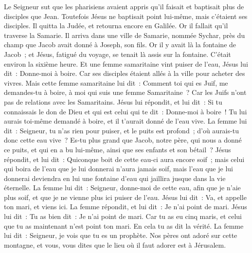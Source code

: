 \begin{multicols}{2}
\VerseOne{}Le Seigneur sut que les pharisiens avaient appris qu'il faisait et baptisait plus de disciples que Jean.
Toutefois Jésus ne baptisait point lui-même, mais c'étaient ses disciples.
Il quitta la Judée, et retourna encore en Galilée.
Or il fallait qu'il traverse la Samarie.
Il arriva dans une ville de Samarie, nommée Sychar, près du champ que Jacob avait donné à Joseph, son fils.
Or il y avait là la fontaine de Jacob~; et Jésus, fatigué du voyage, se tenait là assis sur la fontaine. C'était environ la sixième heure.
Et une femme samaritaine vint puiser de l'eau, Jésus lui dit~: Donne-moi à boire.
Car ses disciples étaient allés à la ville pour acheter des vivres.
Mais cette femme samaritaine lui dit~: Comment toi qui es Juif, me demandes-tu à boire, à moi qui suis une femme Samaritaine~? Car les Juifs n'ont pas de relations avec les Samaritains.
Jésus lui répondit, et lui dit~: Si tu connaissais le don de Dieu et qui est celui qui te dit~: Donne-moi à boire~! Tu lui aurais toi-même demandé à boire, et il t'aurait donné de l'eau vive.
La femme lui dit~: Seigneur, tu n'as rien pour puiser, et le puits est profond~; d'où aurais-tu donc cette eau vive~?
Es-tu plus grand que Jacob, notre père, qui nous a donné ce puits, et qui en a bu lui-même, ainsi que ses enfants et son bétail~?
Jésus répondit, et lui dit~: Quiconque boit de cette eau-ci aura encore soif~;
mais celui qui boira de l'eau que je lui donnerai n'aura jamais soif, mais l'eau que je lui donnerai deviendra en lui une fontaine d'eau qui jaillira jusque dans la vie éternelle.
La femme lui dit~: Seigneur, donne-moi de cette eau, afin que je n'aie plus soif, et que je ne vienne plus ici puiser de l'eau.
Jésus lui dit~: Va, et appelle ton mari, et viens ici.
La femme répondit, et lui dit~: Je n'ai point de mari. Jésus lui dit~: Tu as bien dit~: Je n'ai point de mari.
Car tu as eu cinq maris, et celui que tu as maintenant n'est point ton mari. En cela tu as dit la vérité.
La femme lui dit~: Seigneur, je vois que tu es un prophète.
Nos pères ont adoré sur cette montagne, et vous, vous dites que le lieu où il faut adorer est à Jérusalem.

\end{multicols}
